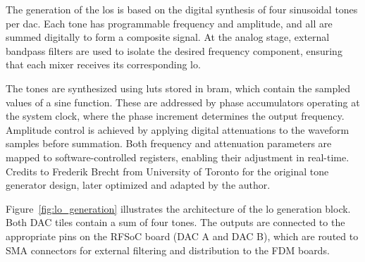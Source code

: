 The generation of the \glspl{lo} is based on the digital synthesis of four sinusoidal tones per \gls{dac}. Each tone has programmable frequency and amplitude, and all are summed digitally to form a composite signal. At the analog stage, external bandpass filters are used to isolate the desired frequency component, ensuring that each mixer receives its corresponding \gls{lo}.

The tones are synthesized using \glspl{lut} stored in \gls{bram}, which contain the sampled values of a sine function. These are addressed by phase accumulators operating at the system clock, where the phase increment determines the output frequency. Amplitude control is achieved by applying digital attenuations to the waveform samples before summation. Both frequency and attenuation parameters are mapped to software-controlled registers, enabling their adjustment in real-time. Credits to Frederik Brecht from University of Toronto for the original tone generator design, later optimized and adapted by the author.

Figure~\ref{fig:lo_generation} illustrates the architecture of the \gls{lo} generation block. Both DAC tiles contain a sum of four tones. The outputs are connected to the appropriate pins on the RFSoC board (DAC A and DAC B), which are routed to SMA connectors for external filtering and distribution to the FDM boards.

